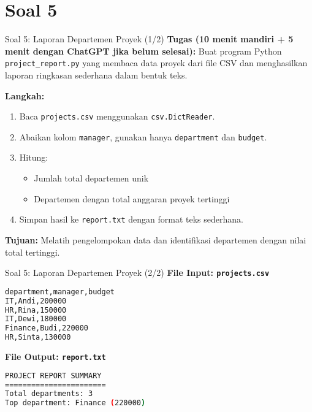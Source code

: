 \documentclass[aspectratio=169, table]{beamer}
\begin{document}
\section{Soal 5}
\begin{frame}[fragile]{Soal 5: Laporan Departemen Proyek (1/2)}
\vspace{15pt}
\textbf{Tugas (10 menit mandiri + 5 menit dengan ChatGPT jika belum selesai):}  
Buat program Python \texttt{project\_report.py} yang membaca data proyek dari file CSV dan menghasilkan laporan ringkasan sederhana dalam bentuk teks.

\textbf{Langkah:}
\begin{enumerate}
  \item Baca \texttt{projects.csv} menggunakan \texttt{csv.DictReader}.
  \item Abaikan kolom \texttt{manager}, gunakan hanya \texttt{department} dan \texttt{budget}.
  \item Hitung:
        \begin{itemize}
          \item Jumlah total departemen unik
          \item Departemen dengan total anggaran proyek tertinggi
        \end{itemize}
  \item Simpan hasil ke \texttt{report.txt} dengan format teks sederhana.
\end{enumerate}

\textbf{Tujuan:}  
Melatih pengelompokan data dan identifikasi departemen dengan nilai total tertinggi.
\end{frame}

\begin{frame}[fragile]{Soal 5: Laporan Departemen Proyek (2/2)}
\vspace{15pt}
\textbf{File Input: \texttt{projects.csv}}
\begin{lstlisting}[language=bash,basicstyle=\ttfamily\small]
department,manager,budget
IT,Andi,200000
HR,Rina,150000
IT,Dewi,180000
Finance,Budi,220000
HR,Sinta,130000
\end{lstlisting}

\textbf{File Output: \texttt{report.txt}}
\begin{lstlisting}[language=bash,basicstyle=\ttfamily\small]
PROJECT REPORT SUMMARY
=======================
Total departments: 3
Top department: Finance (220000)
\end{lstlisting}
\end{frame}
\end{document}

